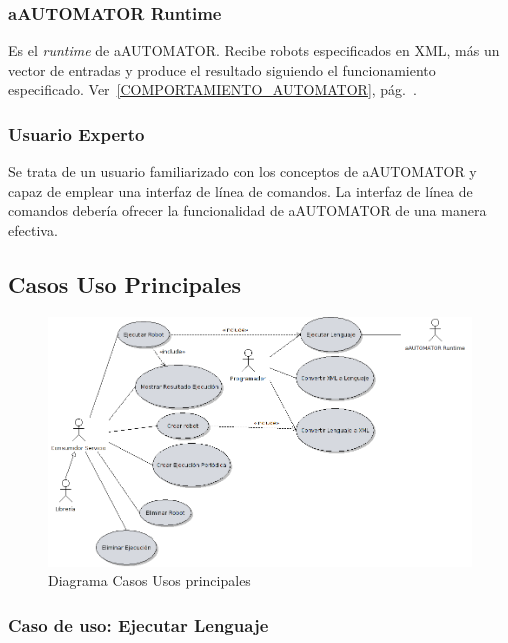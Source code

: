 \subsubsection{aAUTOMATOR Runtime}
Es el \emph{runtime} de aAUTOMATOR. Recibe robots especificados en
XML, más un vector de entradas y produce el resultado siguiendo el
funcionamiento especificado. Ver~\ref{COMPORTAMIENTO_AUTOMATOR},
pág.~\pageref{COMPORTAMIENTO_AUTOMATOR}.

\subsubsection{Usuario Experto}
Se trata de un usuario familiarizado con los conceptos de aAUTOMATOR y
capaz de emplear una interfaz de línea de comandos. La interfaz de
línea de comandos debería ofrecer la funcionalidad de aAUTOMATOR de
una manera efectiva.

\subsection{Casos Uso Principales}
\label{casos_uso_principales_section}

\begin{landscape}
\begin{figure}[p]
\includegraphics[width=1.4\textwidth]{chapters/technical-manual/diagrams/principal_usecases.violet.png}
\caption{Diagrama Casos Usos principales}\label{casos_uso_principales}
\end{figure}
\end{landscape}

\subsubsection{\large{Caso de uso: Ejecutar Lenguaje}}
\label{ejecutar_lenguaje_caso_uso_minilenguaje}

